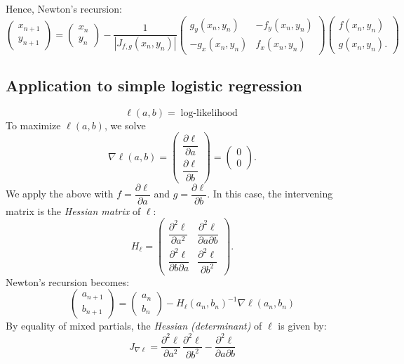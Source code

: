 \documentclass[12pt]{amsart}
\begin{document}
Hence, Newton's recursion:
\[
    \begin{pmatrix}
        x_{n+1}\\y_{n+1}
    \end{pmatrix}
    = \begin{pmatrix}
        x_n\\y_n
    \end{pmatrix}
    - \frac1{|J_{f,g}(x_n,y_n)|}
    \begin{pmatrix}
        g_y(x_n,y_n)&-f_y(x_n,y_n)\\-g_x(x_n,y_n)&f_x(x_n,y_n)
    \end{pmatrix}
    \begin{pmatrix}
        f(x_n,y_n)\\g(x_n,y_n).
    \end{pmatrix}
\]

\subsection{Application to simple logistic regression}
\[
    \ell(a,b) = \text{$\log$-likelihood}
\]
To maximize $\ell(a,b)$, we solve
\[
    \nabla \ell(a,b) = \begin{pmatrix}
        \dfrac{\partial \ell}{\partial a}\\[1.25em]\dfrac{\partial \ell}{\partial b}
    \end{pmatrix} = \begin{pmatrix}
        0\\0
    \end{pmatrix}.
\]
We apply the above with $f=\dfrac{\partial \ell}{\partial a}$ and $g=\dfrac{\partial \ell}{\partial b}$.
In this case, the intervening matrix is the \emph{Hessian matrix} of $\ell$:
\[
    H_\ell=\begin{pmatrix}
        \dfrac{\partial^2\ell}{\partial a^2}&\dfrac{\partial^2\ell}{\partial a\partial b}\\[1.5em]
        \dfrac{\partial^2\ell}{\partial b\partial a}&\dfrac{\partial^2\ell}{\partial b^2}
    \end{pmatrix}.
\]
Newton's recursion becomes:
\[
    \begin{pmatrix}
        a_{n+1}\\b_{n+1}
    \end{pmatrix}
    = \begin{pmatrix}
        a_{n}\\b_{n}
    \end{pmatrix} - H_\ell(a_n, b_n)^{-1}\nabla\ell(a_n, b_n)
\]
By equality of mixed partials, the \emph{Hessian (determinant)} of $\ell$ is given by:
\[
    J_{\nabla \ell} = \dfrac{\partial^2\ell}{\partial a^2}\,\dfrac{\partial^2\ell}{\partial b^2}
    - \dfrac{\partial^2\ell}{\partial a\partial b}
\]
\end{document}
